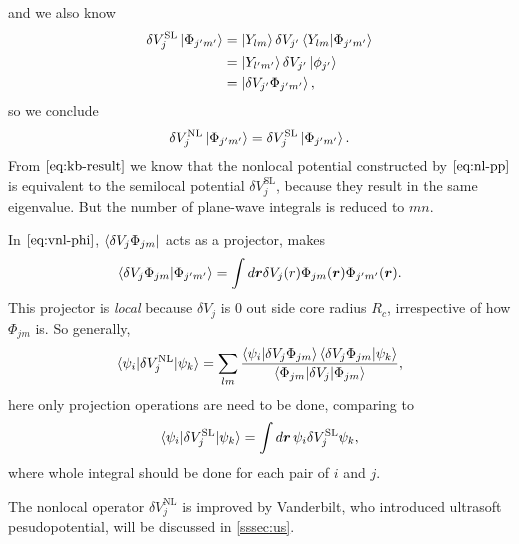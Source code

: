 and we also know
\begin{equation}
	\begin{split}
		\delta V_{j}^\text{SL} \ket{ \Phi_{j'm'} }
		&= \ket{Y_{lm}} \delta V_{j'} \braket{Y_{lm} | \Phi_{j'm'} } \\
		&= \ket{Y_{l'm'}} \delta V_{j'} \ket{\phi_{j'}} \\
		&= \ket{ \delta V_{j'} \Phi_{j'm'} },
	\end{split}
\end{equation}
so we conclude
\begin{equation}\label{eq:kb-result}
	\delta V_j^\text{NL} \ket{\Phi_{j'm'}} = \delta V_{j}^\text{SL} \ket{ \Phi_{j'm'} }.
\end{equation}
From $\eqref{eq:kb-result}$ we know that the nonlocal potential constructed by
$\eqref{eq:nl-pp}$ is equivalent to the semilocal potential $\delta V_{j}^\text{SL}$,
because they result in the same eigenvalue. But the number of
plane-wave integrals is reduced to $mn$.

In $\eqref{eq:vnl-phi}$, $\bra{\delta V_j \Phi_{jm}}$ acts as a projector,\cite{martin2004electronic} makes
\begin{equation}
	\braket{\delta V_j \Phi_{jm} | \Phi_{j'm'} } = \int d\bm{r} \delta V_j (r)
	\Phi_{jm} (\bm{r}) \Phi_{j'm'} (\bm{r}).
\end{equation}
This projector
is \emph{local} because $\delta V_j$ is $0$ out side core radius $R_c$,
irrespective of how $\Phi_{jm}$ is.
So generally,\cite{martin2004electronic}
\begin{equation}
	\braket{ \psi_i | \delta V_j^\text{NL} | \psi_k }
	= \sum_{lm}
	\frac{ \braket{\psi_i | \delta V_j \Phi_{jm}}
		\braket{\delta V_j \Phi_{jm}  | \psi_k } }{
		\braket{ \Phi_{jm} | \delta V_j | \Phi_{jm} } },
\end{equation}
here only projection operations are need to be done,
comparing to
\begin{equation}
	\braket{ \psi_i | \delta V_j^\text{SL} | \psi_k }
	= \int d\bm{r} \, \psi_i \delta V_j^\text{SL} \psi_k,
\end{equation}
where whole integral should be done for each pair of $i$ and $j$.

The nonlocal operator $\delta V_j^\text{NL}$ is improved
by Vanderbilt\cite{Vanderbilt:1990is}, who introduced ultrasoft pesudopotential, will be discussed in \ref{sssec:us}.